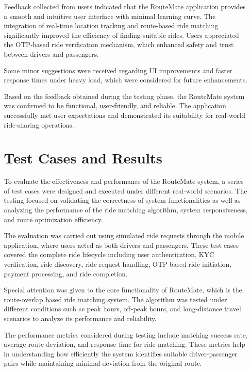 \documentclass[10pt,a4paper]{report}
\begin{document}
\justify\large Feedback collected from users indicated that the RouteMate application provides a smooth and intuitive user interface with minimal learning curve. The integration of real-time location tracking and route-based ride matching significantly improved the efficiency of finding suitable rides. Users appreciated the OTP-based ride verification mechanism, which enhanced safety and trust between drivers and passengers.

\justify\large Some minor suggestions were received regarding UI improvements and faster response times under heavy load, which were considered for future enhancements.

\justify\large Based on the feedback obtained during the testing phase, the RouteMate system was confirmed to be functional, user-friendly, and reliable. The application successfully met user expectations and demonstrated its suitability for real-world ride-sharing operations.

\section{Test Cases and Results}

\justify\large To evaluate the effectiveness and performance of the RouteMate system,
a series of test cases were designed and executed under different real-world
scenarios. The testing focused on validating the correctness of system
functionalities as well as analyzing the performance of the ride matching
algorithm, system responsiveness, and route optimization efficiency.

\justify\large The evaluation was carried out using simulated ride requests
through the mobile application, where users acted as both drivers and passengers.
These test cases covered the complete ride lifecycle including user authentication,
KYC verification, ride discovery, ride request handling, OTP-based ride initiation,
payment processing, and ride completion.

\justify\large Special attention was given to the core functionality of RouteMate,
which is the route-overlap based ride matching system. The algorithm was tested
under different conditions such as peak hours, off-peak hours, and long-distance
travel scenarios to analyze its performance and reliability.

\justify\large The performance metrics considered during testing include matching
success rate, average route deviation, and response time for ride matching. These
metrics help in understanding how efficiently the system identifies suitable
driver-passenger pairs while maintaining minimal deviation from the original route.
\end{document}
